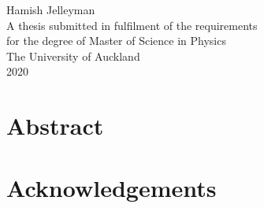 \documentclass[../main.tex]{subfiles}
\begin{document}
\begin{titlepage} \vspace{20mm} \centering
{\Huge\textbf{}\par}  \vspace{20mm} {\Large Hamish Jelleyman} \vspace{20mm} \\ \vspace{20mm} A thesis submitted in fulfilment of the requirements \\ for the degree of Master of Science in Physics \\ \vspace{20mm} The University of Auckland \\ 2020
\end{titlepage}

\chapter*{Abstract}
\chapter*{Acknowledgements}
\tableofcontents
\end{document}
